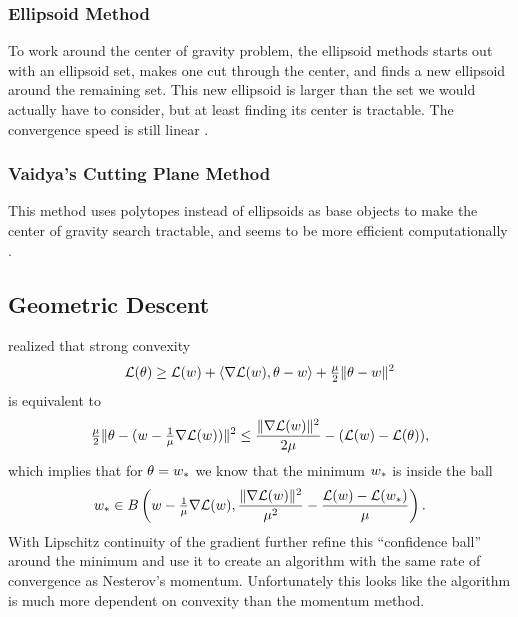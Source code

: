 \subsubsection{Ellipsoid Method}

To work around the center of gravity problem, the ellipsoid methods starts out
with an ellipsoid set, makes one cut through the center, and finds a new
ellipsoid around the remaining set. This new ellipsoid is larger than the
set we would actually have to consider, but at least finding its center is
tractable. The convergence speed is still linear \parencite[e.g][Theorem
2.4]{bubeckConvexOptimizationAlgorithms2015}.


\subsubsection{Vaidya's Cutting Plane Method}

This method uses polytopes instead of ellipsoids as base objects to make the
center of gravity search tractable, and seems to be more efficient
computationally \parencite[e.g.][Section
2.3]{bubeckConvexOptimizationAlgorithms2015}.

\subsection{Geometric Descent}

\textcite{bubeckGeometricAlternativeNesterov2015} realized that strong convexity
\begin{align*}
	\mathcal{L}(\theta)
	\ge \mathcal{L}(w) + \langle \nabla\mathcal{L}(w), \theta-w\rangle
	+ \tfrac{\mu}{2}\|\theta-w\|^2
\end{align*}
is equivalent to
\begin{align*}
	\tfrac{\mu}{2}\|\theta - (w - \tfrac1{\mu} \nabla\mathcal{L}(w))\|^2
	\le \frac{\|\nabla\mathcal{L}(w)\|^2}{2\mu} - (\mathcal{L}(w)-\mathcal{L}(\theta)),
\end{align*}
which implies that for \(\theta=w_*\) we know that the minimum
\(w_*\) is inside the ball
\begin{align*}
	w_*\in B\left(w- \tfrac1{\mu}\nabla\mathcal{L}(w), 
		\frac{\|\nabla\mathcal{L}(w)\|^2}{\mu^2}
		- \frac{ \mathcal{L}(w)-\mathcal{L}(w_*) }{\mu}
	\right).
\end{align*}
With Lipschitz continuity of the gradient \textcite{bubeckGeometricAlternativeNesterov2015}
further refine this ``confidence ball'' around the minimum and use it to create
an algorithm with the same rate of convergence as Nesterov's momentum.
Unfortunately this looks like the algorithm is much more dependent on
convexity than the momentum method.

